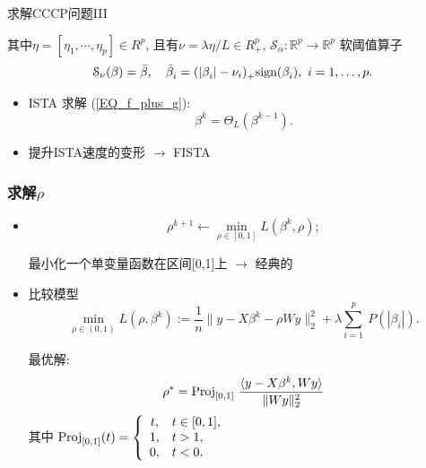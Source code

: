 \documentclass{beamer}
\begin{document}
\begin{frame}{求解CCCP问题III}

其中$\eta = [\eta_1, \cdots, \eta_p]\in R^p$, 且有$\nu = \lambda\eta/L \in R_+^p$,
 $\mathcal{S}_{\alpha}^{}:\mathbb{R}_{}^{p} \rightarrow \mathbb{R}_{}^{p}$  软阈值算子
\begin{equation*}%
  \mathcal{S}_{\nu}(\beta) = \bar{\beta}, \quad \bar{\beta}_{i}^{} = (|\beta_{i}^{}|-\nu_i)_{+}^{} \sgn(\beta_{i}^{}), \ i=1,\ldots,p.
\end{equation*}
\begin{itemize}

\item  ISTA 求解 (\ref{EQ_f_plus_g}):
\begin{equation*}
  \beta_{}^{k} = \Theta_{L}^{}(\beta_{}^{k-1}).
\end{equation*}

\item 提升ISTA速度的变形 $\rightarrow$  FISTA


    \end{itemize}

\end{frame}



\begin{frame}
  \frametitle{求解$\rho$}

  \begin{itemize}
    \item
       \begin{equation} \label{eq-min-rho}
        \rho^{k+1}\leftarrow \min_{\rho\in [0,1]} L(\beta^{k},\rho );
     \end{equation}

  最小化一个单变量函数在区间[0,1]上 $\longrightarrow$
   经典的%

\item 比较模型
   \begin{equation}\label{eq_min_rho}
    \min_{\rho \in (0,1)}^{} L(\rho,\beta^k):= \frac{1}{n} \| y-X\beta^k - \rho W y\|_2^2 + \lambda \sum_{i=1}^p\  P(|\beta_i|).
 \end{equation}

 最优解:
\begin{equation}\label{eq-rho-sol}
    \rho^* = \textnormal{Proj}_{[0,1]}^{}\ \frac{\langle y-X\beta^k, W y\rangle }{\|Wy\|_2^2}
\end{equation}
其中
$
\textnormal{Proj}_{[0,1]}^{}(t) = \left\{\begin{array}{cl}
t, & t \in [0,1], \\
        1, & t> 1, \\
        0, & t<0.  \\
   \end{array}\right.
$
\end{itemize}

\end{frame}
\end{document}
